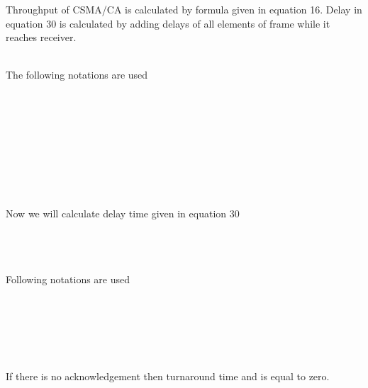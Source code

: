 \documentclass[11pt, conference, compsocconf, onecolumn]{IEEEtran}
\begin{document}
Throughput of CSMA/CA is calculated by formula given in equation 16. Delay in equation 30 is calculated by adding delays of all elements of frame while it reaches receiver.


\\
The following notations are used
\\\\
  
\\
  
\\
  
\\
   
\\
  
\\
  
\\
  
\\\\
Now we will calculate delay time given in equation 30

\\
   
\\
   
\\

Following notations are used
\\\\
 
\\
 
\\
  
\\
  
\\\\
\indent If there is no acknowledgement then turnaround time  and  is equal to zero.
\\
\end{document}
